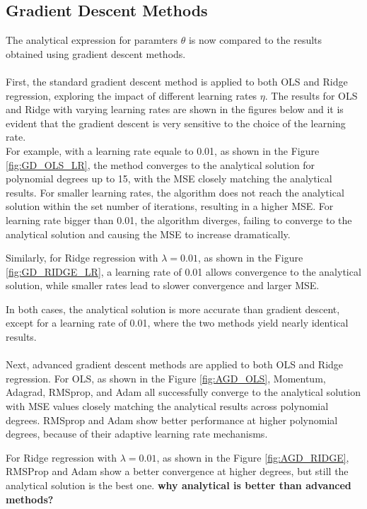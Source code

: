 \documentclass[
 reprint,            %
 amsmath,amssymb,
 aps,
]{revtex4-2}
\begin{document}
\subsection{Gradient Descent Methods}

The analytical expression for paramters $\theta$ is now compared to the results obtained using gradient descent methods.\\\\
First, the standard gradient descent method is applied to both OLS and Ridge regression, exploring the impact of different learning rates $\eta$. 
The results for OLS and Ridge with varying learning rates are shown in the figures below and it is evident that the gradient descent is very sensitive to the choice of the learning rate.\\
For example, with a learning rate equale to 0.01, as shown in the Figure \ref{fig:GD_OLS_LR}, the method converges to the analytical solution for polynomial degrees up to 15, with the MSE closely matching the analytical results.
For smaller learning rates, the algorithm does not reach the analytical solution within the set number of iterations, resulting in a higher MSE. 
For learning rate bigger than 0.01, the algorithm diverges, failing to converge to the analytical solution and causing the MSE to increase dramatically.

Similarly, for Ridge regression with $\lambda = 0.01$, as shown in the Figure \ref{fig:GD_RIDGE_LR}, a learning rate of 0.01 allows convergence to the analytical solution, while smaller rates lead to slower convergence and larger MSE.

 
In both cases, the analytical solution is more accurate than gradient descent, except for a learning rate of 0.01, where the two methods yield nearly identical results.\\\\
Next, advanced gradient descent methods are applied to both OLS and Ridge regression.
For OLS, as shown in the Figure \ref{fig:AGD_OLS}, Momentum, Adagrad, RMSprop, and Adam all successfully converge to the analytical solution with MSE values closely matching the analytical results across polynomial degrees.
 RMSprop and Adam show better performance at higher polynomial degrees, because of their adaptive learning rate mechanisms.



For Ridge regression with $\lambda = 0.01$, as shown in the Figure \ref{fig:AGD_RIDGE}, RMSProp and Adam show a better convergence at higher degrees, but still the analytical solution is the best one. 
\textbf{why analytical is better than advanced methods?}
\end{document}
